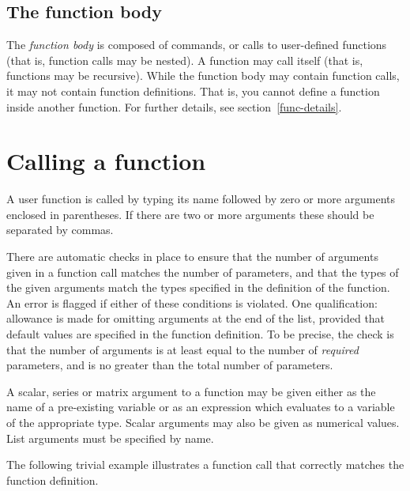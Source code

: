 \subsection{The function body}
   
The \textsl{function body} is composed of  commands, or
calls to user-defined functions (that is, function calls may be
nested).  A function may call itself (that is, functions may be
recursive). While the function body may contain function calls, it may
not contain function definitions.  That is, you cannot define a
function inside another function.  For further details, see
section~\ref{func-details}.


\section{Calling a function}
\label{func-call}

A user function is called by typing its name followed by zero or more
arguments enclosed in parentheses.  If there are two or more arguments
these should be separated by commas.  

There are automatic checks in place to ensure that the number of
arguments given in a function call matches the number of parameters,
and that the types of the given arguments match the types specified in
the definition of the function.  An error is flagged if either of
these conditions is violated.  One qualification: allowance is made
for omitting arguments at the end of the list, provided that default
values are specified in the function definition.  To be precise, the
check is that the number of arguments is at least equal to the number
of \textit{required} parameters, and is no greater than the total
number of parameters.

A scalar, series or matrix argument to a function may be given either
as the name of a pre-existing variable or as an expression which
evaluates to a variable of the appropriate type.  Scalar arguments may
also be given as numerical values.  List arguments must be specified
by name.

The following trivial example illustrates a function call that
correctly matches the function definition.
    

